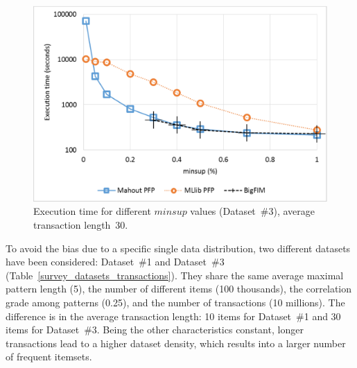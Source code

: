 

\begin{figure}[!t]
\includegraphics[width=5in]{minsup_3_log.eps}
\caption{Execution time for different $minsup$ values
(Dataset~\#3), average transaction length~30.}
\label{minsup_3}
\end{figure}



To avoid the bias due to a specific single data distribution,
two different datasets have been considered:
Dataset~\#1 and Dataset~\#3 (Table~\ref{survey_datasets_transactions}).
They share the same average maximal pattern length (5),
the number of different items (100 thousands),
the correlation grade among patterns (0.25), and
the number of transactions (10 millions).
The difference is in the average transaction length:
10 items for Dataset~\#1 and 30 items for Dataset~\#3.
Being the other characteristics constant,
longer transactions lead to a higher dataset density,
which results into a larger number of frequent itemsets.


